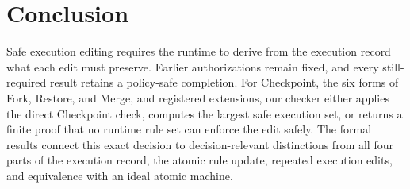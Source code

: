 \section{Conclusion}
\label{sec:conclusion}

Safe execution editing requires the runtime to derive from the execution record what each edit must preserve.
Earlier authorizations remain fixed, and every still-required result retains a policy-safe completion.
For Checkpoint, the six forms of Fork, Restore, and Merge, and registered extensions, our checker either applies the direct Checkpoint check, computes the largest safe execution set, or returns a finite proof that no runtime rule set can enforce the edit safely.
The formal results connect this exact decision to decision-relevant distinctions from all four parts of the execution record, the atomic rule update, repeated execution edits, and equivalence with an ideal atomic machine.
